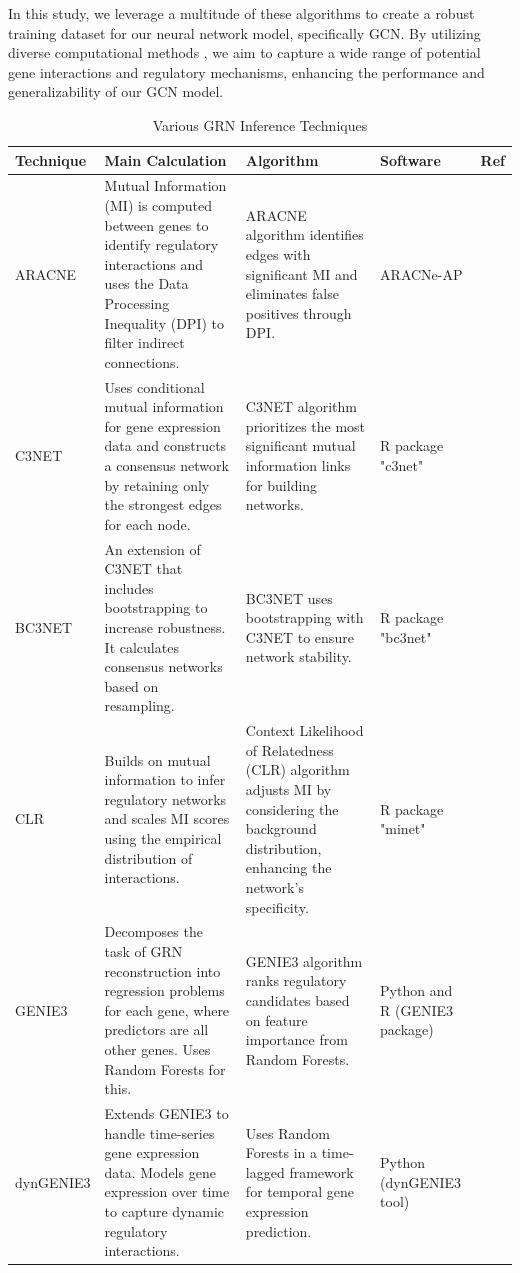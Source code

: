 \documentclass{article}
\begin{document}
In this study, we leverage a multitude of these algorithms to create a robust training dataset for our neural network model, specifically GCN. By utilizing diverse computational methods \cite{chai2014review}, we aim to capture a wide range of potential gene interactions and regulatory mechanisms, enhancing the performance and generalizability of our GCN model.


\begin{longtable}{|p{2cm}|p{5.5cm}|p{3.5cm}|p{2cm}|p{0.5cm}|}
\caption{Various GRN Inference Techniques} \label{tab:GRN_methods} \\ 
\hline
\textbf{Technique} & \textbf{Main Calculation} & \textbf{Algorithm} & \textbf{Software} & \textbf{Ref} \\ \hline
ARACNE & Mutual Information (MI) is computed between genes to identify regulatory interactions and uses the Data Processing Inequality (DPI) to filter indirect connections. & ARACNE algorithm identifies edges with significant MI and eliminates false positives through DPI. & ARACNe-AP & \cite{aracne} \\ \hline
C3NET & Uses conditional mutual information for gene expression data and constructs a consensus network by retaining only the strongest edges for each node. & C3NET algorithm prioritizes the most significant mutual information links for building networks. & R package "c3net" & \cite{c3net} \\ \hline
BC3NET & An extension of C3NET that includes bootstrapping to increase robustness. It calculates consensus networks based on resampling. & BC3NET uses bootstrapping with C3NET to ensure network stability. & R package "bc3net" & \cite{bc3net} \\ \hline
CLR & Builds on mutual information to infer regulatory networks and scales MI scores using the empirical distribution of interactions. & Context Likelihood of Relatedness (CLR) algorithm adjusts MI by considering the background distribution, enhancing the network's specificity. & R package "minet" & \cite{clr} \\ \hline
GENIE3 & Decomposes the task of GRN reconstruction into regression problems for each gene, where predictors are all other genes. Uses Random Forests for this. & GENIE3 algorithm ranks regulatory candidates based on feature importance from Random Forests. & Python and R (GENIE3 package) & \cite{genie3} \\ \hline
dynGENIE3 & Extends GENIE3 to handle time-series gene expression data. Models gene expression over time to capture dynamic regulatory interactions. & Uses Random Forests in a time-lagged framework for temporal gene expression prediction. & Python (dynGENIE3 tool) & \cite{dynGENIE3} \\ \hline

\end{longtable}
\end{document}

